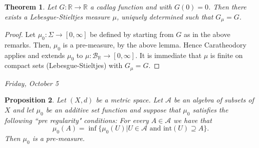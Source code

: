 \documentclass[letterpaper, 12pt]{article}
\newcommand{\cB}{\mathcal{B}}
\newcommand{\bR}{\mathbb{R}}
\newcommand{\sA}{\mathcal{A}}
\theoremstyle{stdthm}
\newtheorem{thm}{Theorem}[section]
\newtheorem{prop}[thm]{Proposition}
\theoremstyle{stddef}
\theoremstyle{stdnonum}
\theoremstyle{stdqands}
\theoremstyle{stdbold}
\begin{document}
\begin{thm}
Let $G:\bR \rightarrow \bR$ a cadlag function and with $G(0) = 0$. Then there exists a Lebesgue-Stieltjes measure $\mu$, uniquely determined such that $G_\mu = G$. 
\end{thm}

\begin{proof}
Let $\mu_0:\Sigma \rightarrow [0,\infty]$ be defined by starting from $G$ as in the above remarks. Then, $\mu_0$ is a pre-measure, by the above lemma. Hence Caratheodory applies and extends $\mu_0$ to $\mu: \cB_\bR \rightarrow [0,\infty]$. It is immediate that $\mu$ is finite on compact sets (Lebesgue-Stieltjes) with $G_\mu = G$.  
\end{proof}

\begin{center}
\emph{Friday, October 5}
\end{center}

\begin{prop}
Let $(X,d)$ be a metric space. Let $\sA$ be an algebra of subsets of $X$ and let $\mu_0$ be an additive set function and suppose that $\mu_0$ satisfies the following ``pre regularity" conditions: For every $A \in \sA$ we have that 
\[
\mu_0(A) = \inf\{\mu_0(U)|U \in \sA \text{ and } \mathrm{int}(U)\supseteq A\}.
\]
Then $\mu_0$ is a pre-measure.

\end{prop}
\end{document}
